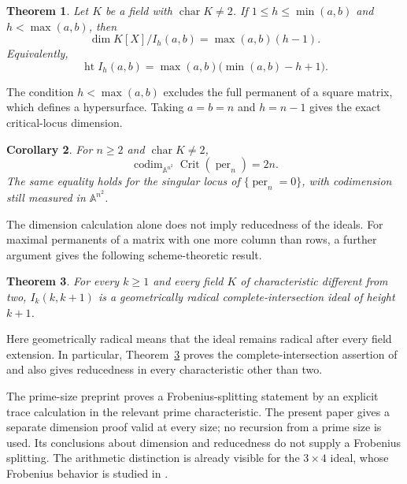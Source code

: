 \documentclass[11pt]{article}
\newtheorem{theorem}{Theorem}[section]
\newtheorem{corollary}[theorem]{Corollary}
\theoremstyle{remark}
\DeclareMathOperator{\per}{per}
\DeclareMathOperator{\codim}{codim}
\DeclareMathOperator{\Crit}{Crit}
\newcommand{\A}{\mathbb A}
\newcommand{\kk}{K}
\numberwithin{equation}{section}
\begin{document}
\begin{theorem}\label{thm:dimension}
Let $\kk$ be a field with $\operatorname{char}\kk\neq2$. If
$1\leq h\leq\min(a,b)$ and $h<\max(a,b)$, then
\begin{equation}\label{eq:main-dimension}
 \dim\kk[X]/I_h(a,b)=\max(a,b)(h-1).
\end{equation}
Equivalently,
\[
 \operatorname{ht} I_h(a,b)
   =\max(a,b)\bigl(\min(a,b)-h+1\bigr).
\]
\end{theorem}

The condition $h<\max(a,b)$ excludes the full permanent of a square
matrix, which defines a hypersurface. Taking $a=b=n$ and $h=n-1$
gives the exact critical-locus dimension.

\begin{samepage}
\begin{corollary}\label{cor:critical-intro}
For $n\geq2$ and $\operatorname{char}\kk\neq2$,
\[
 \codim_{\A^{n^2}}\Crit(\per_n)=2n.
\]
The same equality holds for the singular locus of
$\{\per_n=0\}$, with codimension still measured in $\A^{n^2}$.
\end{corollary}
\end{samepage}

The dimension calculation alone does not imply reducedness of the
ideals. For maximal permanents of a matrix with one more column than
rows, a further argument gives the following scheme-theoretic result.

\begin{theorem}\label{thm:radical-intro}
For every $k\geq1$ and every field $\kk$ of characteristic different
from two, $I_k(k,k+1)$ is a geometrically radical complete-intersection
ideal of height $k+1$.
\end{theorem}

Here geometrically radical means that the ideal remains radical after
every field extension. In particular, Theorem~\ref{thm:radical-intro}
proves the complete-intersection assertion of \cite[Conjecture~3.4]{BCMV}
and also gives reducedness in every characteristic other than two.

The prime-size preprint \cite{XiePrime} proves a Frobenius-splitting
statement by an explicit trace calculation in the relevant prime
characteristic. The present paper gives a separate dimension proof
valid at every size; no recursion from a prime size is used.
Its conclusions about dimension and reducedness do not supply a
Frobenius splitting. The arithmetic distinction is already visible
for the $3\times4$ ideal, whose Frobenius behavior is studied in
\cite{XieThree}.
\end{document}
